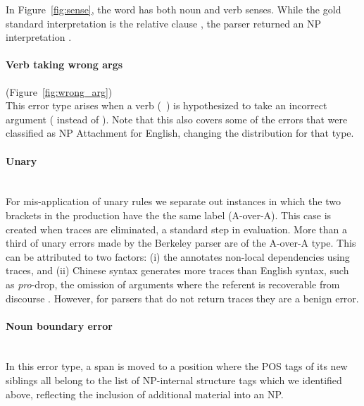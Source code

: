In Figure~\ref{fig:sense}, the word \mbox{} has both noun and
verb senses. While the gold standard interpretation is the relative clause
\mbox{}, the parser returned an NP
interpretation \mbox{}.

\paragraph{Verb taking wrong args} (Figure~\ref{fig:wrong_arg}) \\
This error type
arises when a verb \mbox{(\myeg~)} is hypothesized to take
an incorrect argument (\mbox{} instead of
\mbox{}).  Note that this also covers some of the errors
that were classified as NP Attachment for English, changing
the distribution for that type.

\begin{figure}
\begin{minipage}[b]{0.45\textwidth}
\centering

\end{minipage}\hfill
\begin{minipage}[b]{0.5\textwidth}
\centering

\end{minipage}
\end{figure}

\paragraph{Unary} \strut \\
For mis-application of unary rules we separate out instances in which the two brackets in the production have the the same label (A-over-A).
This case is created when traces are eliminated, a standard step in evaluation.
More than a third of unary errors made by the Berkeley parser are of the A-over-A type.
This can be attributed to two factors: (i) the \pctb annotates non-local dependencies using traces, and (ii) Chinese syntax generates more traces than English syntax, such as \emph{pro}-drop, the omission of arguments where the referent is recoverable from discourse \parencite{Guo-Wang-VanGenabith:2007:EMNLP}.
However, for parsers that do not return traces they are a benign error.

\paragraph{Noun boundary error} \strut \\
In this error type, a span is moved to a
position where the POS tags of its new siblings all belong to the
list of NP-internal structure tags which we identified above, reflecting
the inclusion of additional material into an NP.

